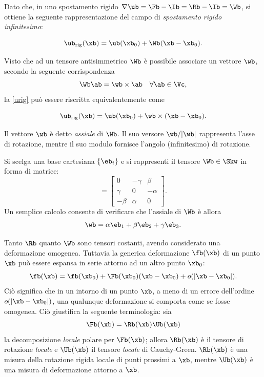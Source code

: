 Dato che, in uno spostamento rigido $\nabla \ub=\Fb-\Ib=\Rb-\Ib=\Wb$, si ottiene la seguente rappresentazione del campo di \textit{spostamento rigido infinitesimo}:
\begin{definition}
	\begin{equation}\label{urig}
\ub_{\rm rig}(\xb)=\ub(\xb_0)+\Wb (\xb-\xb_0).
\end{equation}
\end{definition}
Visto che ad un tensore antisimmetrico $\Wb$ è possibile associare un vettore $\wb$, secondo la seguente corrispondenza
\begin{equation}
	\Wb \ab=\wb \times \ab \quad \forall \ab\in \Vc,
\end{equation}
la \eqref{urig} può essere riscritta equivalentemente come
\begin{definition}
		\begin{equation}\label{urig}
	\ub_{\rm rig}(\xb)=\ub(\xb_0)+\wb \times(\xb-\xb_0).
	\end{equation}
\end{definition}
Il vettore $\wb$ è detto \textit{assiale}  di $\Wb$. Il suo versore $\wb/|\wb|$ rappresenta l'asse di rotazione, mentre il suo modulo fornisce l'angolo (infinitesimo) di rotazione.

\begin{remark}\label{skvec}
Si scelga una base cartesiana $\{\eb_i\}$ e si rappresenti il tensore $\Wb\in\Skw$ in forma di matrice:
\begin{equation}
	[\Wb]=\left[\begin{array}{ccc}0&-\gamma&\beta\\\gamma&0&-\alpha\\-\beta&\alpha&0\end{array}\right].
\end{equation}
Un semplice calcolo consente di verificare che l'assiale di $\Wb$ è allora
\begin{equation}
\wb=\alpha\eb_1+\beta\eb_2+\gamma\eb_3.
\end{equation}
\end{remark}

Tanto $\Rb$ quanto $\Wb$ sono tensori costanti, avendo considerato una deformazione omogenea. Tuttavia la generica deformazione $\fb(\xb)$ di un punto $\xb$ può essere espansa in serie attorno ad un altro punto $\xb_0$:
\begin{equation}
\fb(\xb)=\fb(\xb_0)+\Fb(\xb_0)(\xb-\xb_0)+o(|\xb-\xb_0|).
\end{equation}
Ciò significa che in un intorno di un punto $\xb$, a meno di un errore dell'ordine $o(|\xb-\xb_0|)$, una qualunque deformazione si comporta come se fosse omogenea. Ciò giustifica la seguente terminologia: sia 
\begin{equation}
	\Fb(\xb)=\Rb(\xb)\Ub(\xb)
\end{equation}
la decomposizione \textit{locale} polare per $\Fb(\xb)$; allora $\Rb(\xb)$ è il tensore di rotazione \textit{locale}  e $\Ub(\xb)$ il tensore \textit{locale} di Cauchy-Green. $\Rb(\xb)$ è una misura della rotazione rigida locale di punti prossimi a $\xb$, mentre $\Ub(\xb)$ è una misura di deformazione attorno a $\xb$.


